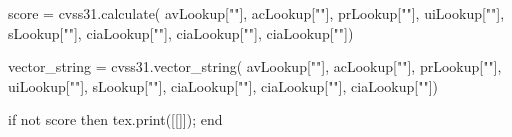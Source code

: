 {{        score = cvss31.calculate(
                       avLookup["\cvssAttackVector"],
                       acLookup["\cvssAttackComplexity"],
                       prLookup["\cvssPrivilegesRequired"],
                       uiLookup["\cvssUserInteraction"],
                       sLookup["\cvssScope"],
                       ciaLookup["\cvssConfidentiality"],
                       ciaLookup["\cvssIntegrity"],
                       ciaLookup["\cvssAvailability"])
        
        vector_string = cvss31.vector_string(
                           avLookup["\cvssAttackVector"],
                           acLookup["\cvssAttackComplexity"],
                           prLookup["\cvssPrivilegesRequired"],
                           uiLookup["\cvssUserInteraction"],
                           sLookup["\cvssScope"],
                           ciaLookup["\cvssConfidentiality"],
                           ciaLookup["\cvssIntegrity"],
                           ciaLookup["\cvssAvailability"])
        
        if not score then
            tex.print([[]]);
        end
    }
}

\newcommand{\cvssdescription}[1]{
    \directlua{
        description = "\luatexluaescapestring{#1}"
    }
}

\newcommand{\cvsslevel}[3]{
    \texorpdfstring{%
        \ifstrequal{#3}{big}{%
            \tcbox[on line,boxsep=0pt,left=4pt,right=4pt,top=4pt,bottom=4pt,colback=#1,boxrule=0pt,frame empty,right skip=0pt]%
            {\textcolor{white}{\sffamily\textbf{#2}}}%
        } %
        { %
            \tcbox[on line,boxsep=0pt,left=4pt,right=4pt,top=2pt,bottom=2pt,colback=#1,boxrule=0pt,frame empty,right skip=0pt]%
            {\textcolor{white}{\sffamily\textbf{#2}}}}%
        }%
    {#2:} %
}

\newcommand{\cvsscritical}[1]{\cvsslevel{Firebrick3}{CRITICAL}{#1}}
\newcommand{\cvsshigh}[1]{\cvsslevel{DarkOrange3}{HIGH}{#1}}
\newcommand{\cvssmedium}[1]{\cvsslevel{DarkGoldenrod3}{MEDIUM}{#1}}
\newcommand{\cvsslow}[1]{\cvsslevel{Chartreuse4}{LOW}{#1}}
\newcommand{\cvssinfo}[1]{\cvsslevel{DodgerBlue3}{INFO}{#1}}

\newcommand{\makecvssbadge}[0]{
    \directlua{tex.print(dofile("macros/cvss/drawbadge.lua"))}
}

\newcommand{\cvssaddtosummary}[1]{
    \directlua{
        summary = require("macros/cvss/summary.lua")
        summary.add("\luatexluaescapestring{#1}")
    }
    \label{sec:#1}
}

